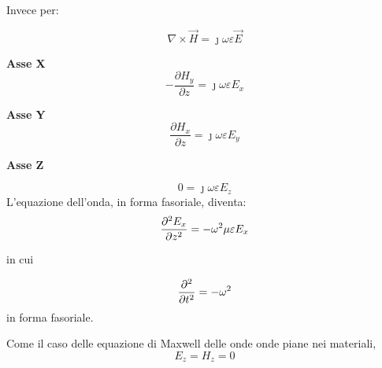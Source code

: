 Invece per: 

{
    \Large
    \begin{equation}
    \nabla \times \vec{H} = \jmath \omega \varepsilon \vec{E} 
    \end{equation}
}

\textbf{Asse X} 
{
    \Large 
    \begin{equation}
        -\frac{\partial H_y}{\partial z} = \jmath \omega \varepsilon E_x   
    \end{equation}
} 


\textbf{Asse Y} 
{
    \Large
    \begin{equation}
    \frac{\partial H_x}{\partial z} = \jmath \omega \varepsilon E_y   
    \end{equation}
}

\textbf{Asse Z} 

{
    \Large
    \begin{equation}
    0 = \jmath \omega \varepsilon E_z  
    \end{equation}
}
L'equazione dell'onda, in forma fasoriale, diventa: \\ 

{
    \Large
    \begin{equation}
    \pdv[2]{E_x}{z} = - \omega ^ 2 \mu \varepsilon E_x   
    \end{equation}
}

in cui 

{
    \Large
    \begin{equation}
        \pdv[2]{}{t} = - \omega ^ 2   
    \end{equation}
}
in forma fasoriale. 

Come il caso delle equazione di Maxwell delle onde onde piane nei materiali, 
{
    \Large
    \begin{equation}
E_z = H_z = 0 
    \end{equation}
}
\newpage 









